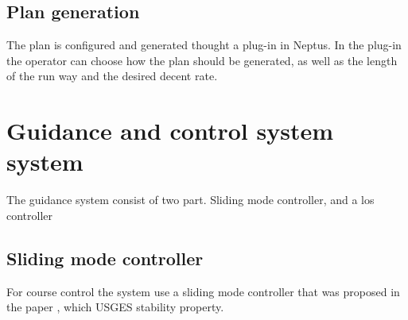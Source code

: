 \subsection{Plan generation}\label{SS:PlanGeneration}
The plan is configured and generated thought a plug-in in Neptus. In the plug-in the operator can choose how the plan should be generated, as well as the length of the run way and the desired decent rate.
\section{Guidance and control system system}
The guidance system consist of two part. Sliding mode controller, and a los controller

\subsection{Sliding mode controller}
For course control the system use a sliding mode controller that was proposed in the paper \citep{fortuna2015cascaded}, which USGES stability property.